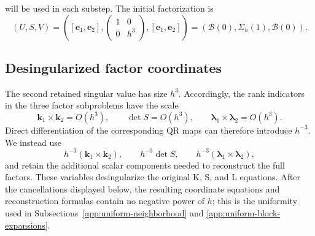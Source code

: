 \documentclass[10pt,a4paper]{amsart}
\numberwithin{equation}{section}
\begin{document}
will be used in each substep.  The
initial factorization is
\begin{equation}\label{eq:factor-start}
 (U,S,V)=\left(
 [\boldsymbol e_1,\boldsymbol e_2],
 \begin{pmatrix}1&0\\0&h^3\end{pmatrix},
 [\boldsymbol e_1,\boldsymbol e_2]\right)
 =(\mathcal B(0),\Sigma_h(1),\mathcal B(0)).
\end{equation}

\subsection{Desingularized factor coordinates}
\label{app:desingularized-factor-coordinates}

The second retained singular value has size \(h^3\).  Accordingly,
the rank indicators in the three factor subproblems have the scale
\[
 \boldsymbol k_1\times\boldsymbol k_2=O(h^3),
 \qquad
 \det S=O(h^3),
 \qquad
 \boldsymbol\lambda_1\times\boldsymbol\lambda_2=O(h^3).
\]
Direct differentiation of the corresponding QR maps can therefore
introduce \(h^{-3}\).  We instead use
\[
 h^{-3}(\boldsymbol k_1\times\boldsymbol k_2),
 \qquad
 h^{-3}\det S,
 \qquad
 h^{-3}(\boldsymbol\lambda_1\times\boldsymbol\lambda_2),
\]
and retain the additional scalar components needed to reconstruct the
full factors.  These variables desingularize the original K, S, and L
equations.  After the cancellations displayed below, the resulting
coordinate equations and reconstruction formulas contain no negative
power of \(h\); this is the uniformity used in
Subsections~\ref{app:uniform-neighborhood} and
\ref{app:uniform-block-expansions}.
\end{document}
